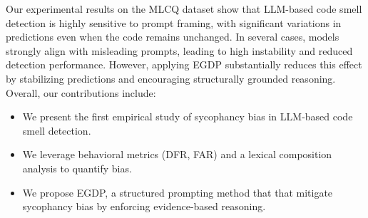 \documentclass[sigconf,review,anonymous]{acmart}
\begin{document}
Our experimental results on the MLCQ dataset \cite{mlcq} show that LLM-based code smell detection is highly sensitive to prompt framing, with significant variations in predictions even when the code remains unchanged. In several cases, models strongly align with misleading prompts, leading to high instability and reduced detection performance. However, applying EGDP substantially reduces this effect by stabilizing predictions and encouraging structurally grounded reasoning. Overall, our contributions include:

\begin{itemize}
    \item We present the first empirical study of sycophancy bias in LLM-based code smell detection.
    \item We leverage behavioral metrics (DFR, FAR) and a lexical composition analysis to quantify bias.
    \item We propose EGDP, a structured prompting method that that mitigate sycophancy bias by enforcing evidence-based reasoning.
\end{itemize}





\end{document}
